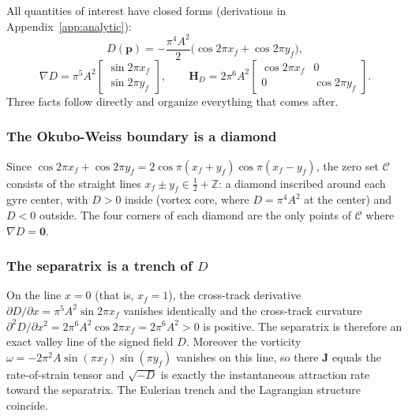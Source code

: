 \documentclass[lettersize,journal]{IEEEtran}
\begin{document}
All quantities of interest have closed forms (derivations in
Appendix~\ref{app:analytic}):
\begin{equation}
    D(\mathbf{p}) = -\frac{\pi^4 A^2}{2}
    \bigl(\cos 2\pi x_f + \cos 2\pi y_f\bigr),
    \label{eq:det_analytic_main}
\end{equation}
\begin{equation}
    \nabla D = \pi^5 A^2
    \begin{bmatrix} \sin 2\pi x_f \\ \sin 2\pi y_f \end{bmatrix},
    \qquad
    \mathbf{H}_D = 2\pi^6 A^2
    \begin{bmatrix} \cos 2\pi x_f & 0 \\ 0 & \cos 2\pi y_f \end{bmatrix}.
    \label{eq:gradhess_analytic_main}
\end{equation}
Three facts follow directly and organize everything that comes after.

\subsubsection{The Okubo-Weiss boundary is a diamond}
Since $\cos 2\pi x_f + \cos 2\pi y_f = 2\cos\pi(x_f + y_f)\cos\pi(x_f -
y_f)$, the zero set $\mathcal{C}$ consists of the straight lines
$x_f \pm y_f \in \tfrac{1}{2} + \mathbb{Z}$: a diamond inscribed around
each gyre center, with $D > 0$ inside (vortex core, where $D = \pi^4 A^2$
at the center) and $D < 0$ outside. The four corners of each diamond are
the only points of $\mathcal{C}$ where $\nabla D = \mathbf{0}$.

\subsubsection{The separatrix is a trench of $D$}
On the line $x = 0$ (that is, $x_f = 1$), the cross-track derivative
$\partial D/\partial x = \pi^5 A^2 \sin 2\pi x_f$ vanishes identically
and the cross-track curvature $\partial^2 D/\partial x^2 = 2\pi^6 A^2
\cos 2\pi x_f = 2\pi^6 A^2 > 0$ is positive. The separatrix is therefore
an exact valley line of the signed field $D$. Moreover the vorticity
$\omega = -2\pi^2 A \sin(\pi x_f)\sin(\pi y_f)$ vanishes on this line, so
there $\mathbf{J}$ equals the rate-of-strain tensor and $\sqrt{-D}$ is
exactly the instantaneous attraction rate toward the separatrix. The
Eulerian trench and the Lagrangian structure coincide.
\end{document}
